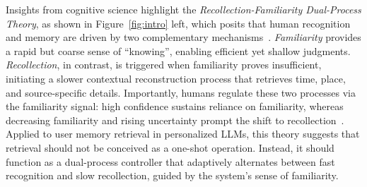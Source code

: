 Insights from cognitive science highlight the \emph{Recollection-Familiarity Dual-Process Theory}, as shown in Figure~\ref{fig:intro} left, which posits that human recognition and memory are driven by two complementary mechanisms~\citep{henson1999recollection, yonelinas2002effects, merkow2015human, bastin2019integrative, yonelinas2024role}. \emph{Familiarity} provides a rapid but coarse sense of ``knowing'', enabling efficient yet shallow judgments. \emph{Recollection}, in contrast, is triggered when familiarity proves insufficient, initiating a slower contextual reconstruction process that retrieves time, place, and source-specific details. Importantly, humans regulate these two processes via the familiarity signal: high confidence sustains reliance on familiarity, whereas decreasing familiarity and rising uncertainty prompt the shift to recollection~\citep{rugg2007event, yonelinas2024role}. Applied to user memory retrieval in personalized LLMs, this theory suggests that retrieval should not be conceived as a one-shot operation. Instead, it should function as a dual-process controller that adaptively alternates between fast recognition and slow recollection, guided by the system's sense of familiarity.


